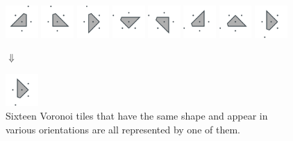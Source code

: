 \documentclass[text.tex]{subfiles}
\begin{document}
\begin{figure}[h!]
\includegraphics[width=0.11\textwidth]{img/results/tiles/octagon_100000_(1_0alpha_1)_025.pdf}
\includegraphics[width=0.11\textwidth]{img/results/tiles/octagon_100000_(1_0alpha_1)_026.pdf}
\includegraphics[width=0.11\textwidth]{img/results/tiles/octagon_100000_(1_0alpha_1)_027.pdf}
\includegraphics[width=0.11\textwidth]{img/results/tiles/octagon_100000_(1_0alpha_1)_028.pdf}
\includegraphics[width=0.11\textwidth]{img/results/tiles/octagon_100000_(1_0alpha_1)_029.pdf}
\includegraphics[width=0.11\textwidth]{img/results/tiles/octagon_100000_(1_0alpha_1)_030.pdf}
\includegraphics[width=0.11\textwidth]{img/results/tiles/octagon_100000_(1_0alpha_1)_031.pdf}
\includegraphics[width=0.11\textwidth]{img/results/tiles/octagon_100000_(1_0alpha_1)_032.pdf}

$\Downarrow$

\includegraphics[width=0.11\textwidth]{img/results/tiles/octagon_100000_(1_0alpha_1)_pick.pdf}
\caption{Sixteen Voronoi tiles that have the same shape and appear in various orientations are all represented by one of them. }
\label{fig_results_tiles}
\end{figure}
\end{document}
